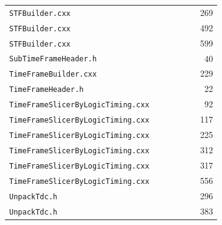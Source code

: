 {\begin{longtable}{p{0.70\linewidth}r}
\texttt{STFBuilder.cxx} & 269 \\
\texttt{STFBuilder.cxx} & 492 \\
\texttt{STFBuilder.cxx} & 599 \\
\texttt{SubTimeFrameHeader.h} & 40 \\
\texttt{TimeFrameBuilder.cxx} & 229 \\
\texttt{TimeFrameHeader.h} & 22 \\
\texttt{TimeFrameSlicerByLogicTiming.cxx} & 92 \\
\texttt{TimeFrameSlicerByLogicTiming.cxx} & 117 \\
\texttt{TimeFrameSlicerByLogicTiming.cxx} & 225 \\
\texttt{TimeFrameSlicerByLogicTiming.cxx} & 312 \\
\texttt{TimeFrameSlicerByLogicTiming.cxx} & 317 \\
\texttt{TimeFrameSlicerByLogicTiming.cxx} & 556 \\
\texttt{UnpackTdc.h} & 296 \\
\texttt{UnpackTdc.h} & 383 \\
\hline\end{longtable}}
